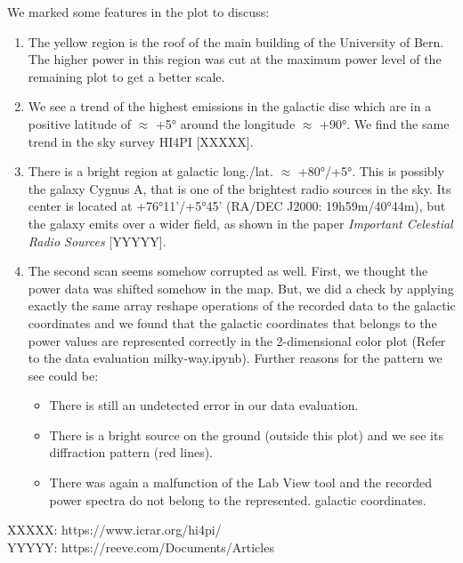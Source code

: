 We marked some features in the plot to discuss:
\begin{enumerate}
	\item The yellow region is the roof of the main building of the University of Bern. The higher power in this region was cut at the maximum power level of the remaining plot to get a better scale.
	\item We see a trend of the highest emissions in the galactic disc which are in a positive latitude of $\approx$ +5° around the longitude $\approx$ +90°. We find the same trend in the sky survey HI4PI [XXXXX].
	\item There is a bright region at galactic long./lat. $\approx$ +80°/+5°. This is possibly the galaxy Cygnus A, that is one of the brightest radio sources in the sky. Its center is located at +76°11'/+5°45' (RA/DEC J2000: 19h59m/40°44m), but the galaxy emits over a wider field, as shown in the paper \textit{Important Celestial Radio Sources} [YYYYY].
	\item The second scan seems somehow corrupted as well. First, we thought the power data was shifted somehow in the map. But, we did a check by applying exactly the same array reshape operations of the recorded data to the galactic coordinates and we found that the galactic coordinates that belongs to the power values are represented correctly in the 2-dimensional color plot (Refer to the data evaluation milky-way.ipynb). Further reasons for the pattern we see could be:
	\begin{itemize}
		\item There is still an undetected error in our data evaluation.
		\item There is a bright source on the ground (outside this plot) and we see its diffraction pattern (red lines).
		\item There was again a malfunction of the Lab View tool and the recorded power spectra do not belong to the represented. galactic coordinates.
	\end{itemize}
\end{enumerate}



XXXXX: https://www.icrar.org/hi4pi/ \\
YYYYY: https://reeve.com/Documents/Articles%